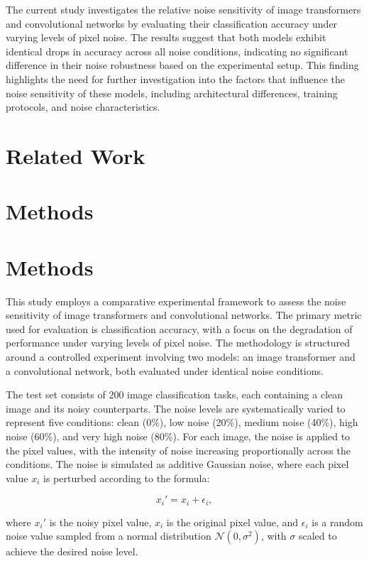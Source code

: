 \documentclass{article}
\begin{document}
The current study investigates the relative noise sensitivity of image transformers and convolutional networks by evaluating their classification accuracy under varying levels of pixel noise. The results suggest that both models exhibit identical drops in accuracy across all noise conditions, indicating no significant difference in their noise robustness based on the experimental setup. This finding highlights the need for further investigation into the factors that influence the noise sensitivity of these models, including architectural differences, training protocols, and noise characteristics.
\section{Related Work}

\section{Methods}
\section{Methods}

This study employs a comparative experimental framework to assess the noise sensitivity of image transformers and convolutional networks. The primary metric used for evaluation is classification accuracy, with a focus on the degradation of performance under varying levels of pixel noise. The methodology is structured around a controlled experiment involving two models: an image transformer and a convolutional network, both evaluated under identical noise conditions.

The test set consists of 200 image classification tasks, each containing a clean image and its noisy counterparts. The noise levels are systematically varied to represent five conditions: clean (0\%), low noise (20\%), medium noise (40\%), high noise (60\%), and very high noise (80\%). For each image, the noise is applied to the pixel values, with the intensity of noise increasing proportionally across the conditions. The noise is simulated as additive Gaussian noise, where each pixel value $ x_i $ is perturbed according to the formula:

$$
x_i' = x_i + \epsilon_i,
$$

where $ x_i' $ is the noisy pixel value, $ x_i $ is the original pixel value, and $ \epsilon_i $ is a random noise value sampled from a normal distribution $ \mathcal{N}(0, \sigma^2) $, with $ \sigma $ scaled to achieve the desired noise level.
\end{document}
